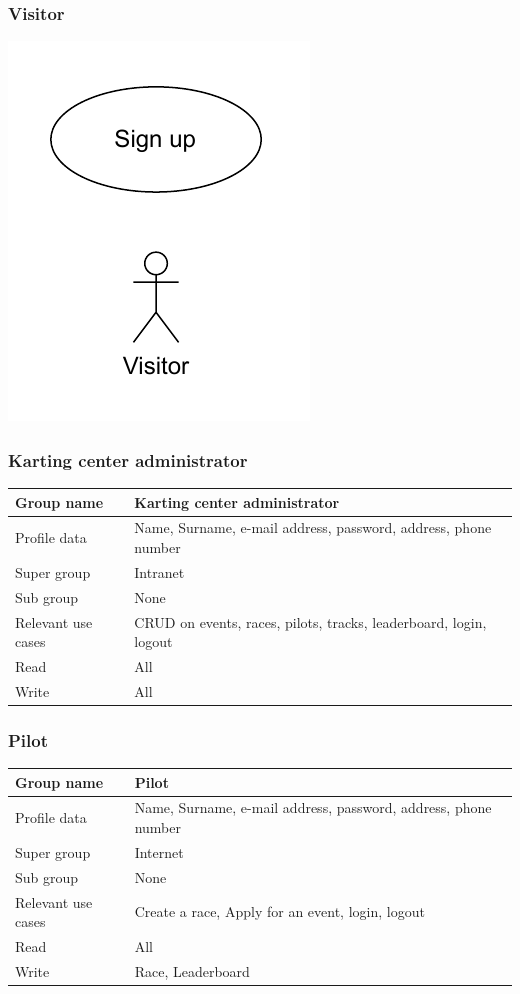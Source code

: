 \documentclass{beamer}
\begin{document}
\begin{frame}
    \frametitle{Visitor}
    \centering
    \includegraphics[width=0.3\linewidth]{drawio/visitor.pdf}
\end{frame}

\begin{frame}
\frametitle{Karting center administrator}

\begin{table}
    \tiny
    \begin{tabular}{|p{2cm}|p{6cm}|}
    \hline
    Group name & \textbf{Karting center administrator} \\
    \hline
    Profile data & Name, Surname, e-mail address, password, address, phone number \\
    \hline
    Super group & Intranet \\
    \hline
    Sub group & None \\
    \hline
    Relevant use cases & CRUD on events, races, pilots, tracks, leaderboard, 
    login, logout \\
    \hline
    Read & All \\
    \hline
    Write & All \\
    \hline
    \end{tabular}
    \end{table}
\end{frame}

\begin{frame}
\frametitle{Pilot}

\begin{table}
    \tiny
    \begin{tabular}{|p{2cm}|p{6cm}|}
    \hline
    Group name & \textbf{Pilot} \\
    \hline
    Profile data & Name, Surname, e-mail address, password, address, phone number \\
    \hline
    Super group & Internet \\
    \hline
    Sub group & None \\
    \hline
    Relevant use cases & Create a race, Apply for an event, 
    login, logout \\
    \hline
    Read & All \\
    \hline
    Write & Race, Leaderboard \\
    \hline
    \end{tabular}
    \end{table}

\end{frame}
\end{document}
